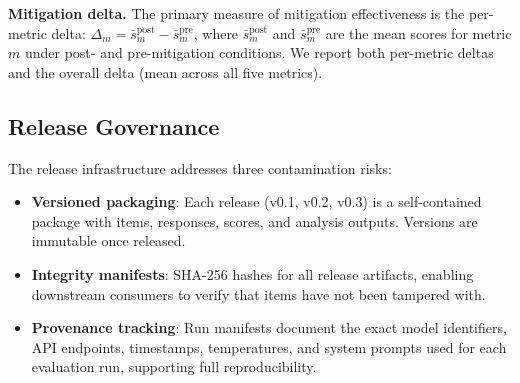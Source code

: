 \textbf{Mitigation delta.} The primary measure of mitigation effectiveness is the per-metric delta: $\Delta_m = \bar{s}^{\text{post}}_m - \bar{s}^{\text{pre}}_m$, where $\bar{s}^{\text{post}}_m$ and $\bar{s}^{\text{pre}}_m$ are the mean scores for metric $m$ under post- and pre-mitigation conditions. We report both per-metric deltas and the overall delta (mean across all five metrics).

\subsection{Release Governance}
\label{sec:governance}

The release infrastructure addresses three contamination risks:

\begin{itemize}[nosep,leftmargin=*]
  \item \textbf{Versioned packaging}: Each release (v0.1, v0.2, v0.3) is a self-contained package with items, responses, scores, and analysis outputs. Versions are immutable once released.
  \item \textbf{Integrity manifests}: SHA-256 hashes for all release artifacts, enabling downstream consumers to verify that items have not been tampered with.
  \item \textbf{Provenance tracking}: Run manifests document the exact model identifiers, API endpoints, timestamps, temperatures, and system prompts used for each evaluation run, supporting full reproducibility.
\end{itemize}

